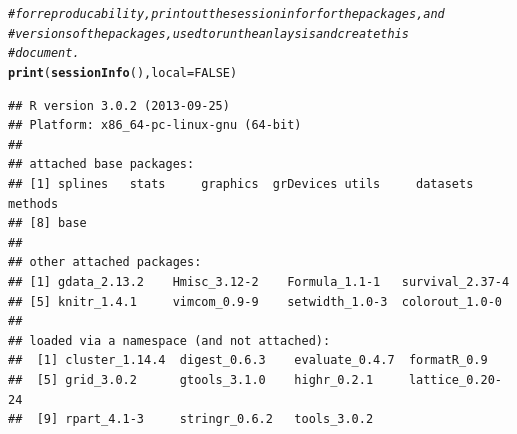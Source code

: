 \documentclass[letterpaper, 10pt]{article}\usepackage[]{graphicx}\usepackage[]{color}
\makeatletter
\newcommand{\hlnum}[1]{\textcolor[rgb]{0.686,0.059,0.569}{#1}}%
\newcommand{\hlcom}[1]{\textcolor[rgb]{0.678,0.584,0.686}{\textit{#1}}}%
\newcommand{\hlstd}[1]{\textcolor[rgb]{0.345,0.345,0.345}{#1}}%
\newcommand{\hlkwc}[1]{\textcolor[rgb]{0.333,0.667,0.333}{#1}}%
\newcommand{\hlkwd}[1]{\textcolor[rgb]{0.737,0.353,0.396}{\textbf{#1}}}%
\newenvironment{kframe}{%
 \def\at@end@of@kframe{}%
 \ifinner\ifhmode%
  \def\at@end@of@kframe{\end{minipage}}%
  \begin{minipage}{\columnwidth}%
 \fi\fi%
 \def\FrameCommand##1{\hskip\@totalleftmargin \hskip-\fboxsep
 \colorbox{shadecolor}{##1}\hskip-\fboxsep
     \hskip-\linewidth \hskip-\@totalleftmargin \hskip\columnwidth}%
 \MakeFramed {\advance\hsize-\width
   \@totalleftmargin\z@ \linewidth\hsize
   \@setminipage}}%
 {\par\unskip\endMakeFramed%
 \at@end@of@kframe}
\newenvironment{knitrout}{}{} %
\makeatother
\begin{document}
\begin{knitrout}
\color{fgcolor}\begin{kframe}
\begin{alltt}
\hlcom{# for reproducability, print out the session infor for the packages, and}
\hlcom{# versions of the packages, used to run the anlaysis and create this}
\hlcom{# document.}
\hlkwd{print}\hlstd{(}\hlkwd{sessionInfo}\hlstd{(),} \hlkwc{local} \hlstd{=} \hlnum{FALSE}\hlstd{)}
\end{alltt}
\begin{verbatim}
## R version 3.0.2 (2013-09-25)
## Platform: x86_64-pc-linux-gnu (64-bit)
## 
## attached base packages:
## [1] splines   stats     graphics  grDevices utils     datasets  methods  
## [8] base     
## 
## other attached packages:
## [1] gdata_2.13.2    Hmisc_3.12-2    Formula_1.1-1   survival_2.37-4
## [5] knitr_1.4.1     vimcom_0.9-9    setwidth_1.0-3  colorout_1.0-0 
## 
## loaded via a namespace (and not attached):
##  [1] cluster_1.14.4  digest_0.6.3    evaluate_0.4.7  formatR_0.9    
##  [5] grid_3.0.2      gtools_3.1.0    highr_0.2.1     lattice_0.20-24
##  [9] rpart_4.1-3     stringr_0.6.2   tools_3.0.2
\end{verbatim}
\end{kframe}
\end{knitrout}

\end{document}
